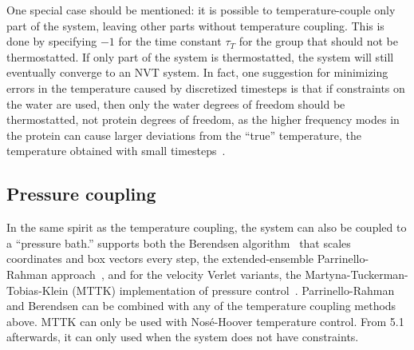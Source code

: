 One special case should be mentioned: it is possible to temperature-couple only
part of the system, leaving other parts without temperature
coupling. This is done by specifying ${-1}$ for the time constant
$\tau_T$ for the group that should not be thermostatted.  If only
part of the system is thermostatted, the system will still eventually
converge to an NVT system.  In fact, one suggestion for minimizing
errors in the temperature caused by discretized timesteps is that if
constraints on the water are used, then only the water degrees of
freedom should be thermostatted, not protein degrees of freedom, as
the higher frequency modes in the protein can cause larger deviations
from the ``true'' temperature, the temperature obtained with small
timesteps~\cite{Eastwood2010}.

\subsection{Pressure coupling}
In the same spirit as the temperature coupling, the system can also be
coupled to a ``pressure bath.'' {\gromacs} supports both the Berendsen
algorithm~\cite{Berendsen84} that scales coordinates and box vectors
every step, the extended-ensemble Parrinello-Rahman approach~\cite{Parrinello81,Nose83}, and for
the velocity Verlet variants, the Martyna-Tuckerman-Tobias-Klein
(MTTK) implementation of pressure
control~\cite{Martyna1996}. Parrinello-Rahman and Berendsen can be
combined with any of the temperature coupling methods above. MTTK can
only be used with Nos{\'e}-Hoover temperature control. From 5.1 afterwards,
it can only used when the system does not have constraints.

